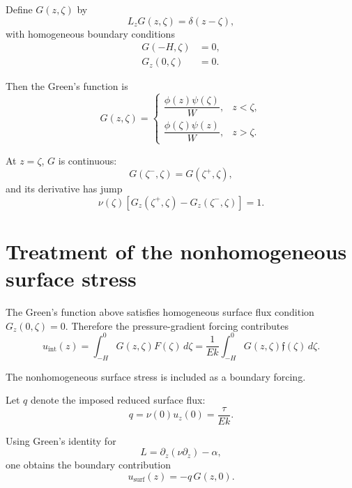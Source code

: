 \documentclass[10pt]{amsart}
\begin{document}
Define \(G(z,\zeta)\) by
\begin{equation}
L_z G(z,\zeta)=\delta(z-\zeta),
\label{eq:green_def}
\end{equation}
with homogeneous boundary conditions
\begin{align}
G(-H,\zeta)&=0, \label{eq:G_bottom}\\
G_z(0,\zeta)&=0. \label{eq:G_surface}
\end{align}

Then the Green's function is
\begin{equation}
G(z,\zeta)
=
\begin{cases}
\dfrac{\phi(z)\psi(\zeta)}{W},
& z<\zeta,\\[1.2em]
\dfrac{\phi(\zeta)\psi(z)}{W},
& z>\zeta.
\end{cases}
\label{eq:green}
\end{equation}

At \(z=\zeta\), \(G\) is continuous:
\begin{equation}
G(\zeta^-,\zeta)=G(\zeta^+,\zeta),
\end{equation}
and its derivative has jump
\begin{equation}
\nu(\zeta)
\left[
G_z(\zeta^+,\zeta)-G_z(\zeta^-,\zeta)
\right]
=
1.
\label{eq:jump}
\end{equation}

\section{Treatment of the nonhomogeneous surface stress}

The Green's function above satisfies homogeneous surface flux condition \(G_z(0,\zeta)=0\). Therefore the pressure-gradient forcing contributes
\begin{equation}
u_{\mathrm{int}}(z)
=
\int_{-H}^{0}
G(z,\zeta)F(\zeta)\,d\zeta
=
\frac{1}{E k}
\int_{-H}^{0}
G(z,\zeta)\mathfrak f(\zeta)\,d\zeta.
\label{eq:uint}
\end{equation}

The nonhomogeneous surface stress is included as a boundary forcing.

Let \(q\) denote the imposed reduced surface flux:
\begin{equation}
q=\nu(0)u_z(0)=\frac{\tau}{E k}.
\label{eq:q}
\end{equation}

Using Green's identity for
\[
L=\partial_z(\nu\partial_z)-\alpha,
\]
one obtains the boundary contribution
\begin{equation}
u_{\mathrm{surf}}(z)
=
- q\,G(z,0).
\label{eq:usurf}
\end{equation}
\end{document}
